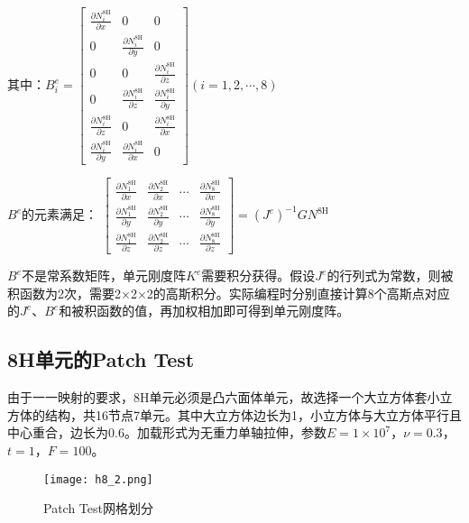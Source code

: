 \documentclass[forprint]{WHUBachelor}
\begin{document}
其中：$B_{i}^{e}=\left[\begin{array}{ccc}
\frac{\partial N_{i}^{8\mathrm{H}}}{\partial x} & 0 & 0\\
0 & \frac{\partial N_{i}^{8\mathrm{H}}}{\partial y} & 0\\
0 & 0 & \frac{\partial N_{i}^{8\mathrm{H}}}{\partial z}\\
0 & \frac{\partial N_{i}^{8\mathrm{H}}}{\partial z} & \frac{\partial N_{i}^{8\mathrm{H}}}{\partial y}\\
\frac{\partial N_{i}^{8\mathrm{H}}}{\partial z} & 0 & \frac{\partial N_{i}^{8\mathrm{H}}}{\partial x}\\
\frac{\partial N_{i}^{8\mathrm{H}}}{\partial y} & \frac{\partial N_{i}^{8\mathrm{H}}}{\partial x} & 0
\end{array}\right](i=1,2,\cdots,8)$
 
$B^{e}$的元素满足：
$\left[\begin{array}{cccc}
\frac{\partial N_{1}^{8\mathrm{H}}}{\partial x} & \frac{\partial N_{2}^{8\mathrm{H}}}{\partial x} & \cdots & \frac{\partial N_{8}^{8\mathrm{H}}}{\partial x}\\
\frac{\partial N_{1}^{8\mathrm{H}}}{\partial y} & \frac{\partial N_{2}^{8\mathrm{H}}}{\partial y} & \cdots & \frac{\partial N_{8}^{8\mathrm{H}}}{\partial y}\\
\frac{\partial N_{1}^{8\mathrm{H}}}{\partial z} & \frac{\partial N_{2}^{8\mathrm{H}}}{\partial z} & \cdots & \frac{\partial N_{8}^{8\mathrm{H}}}{\partial z}
\end{array}\right]=(J^{e})^{-1}GN^{8\mathrm{H}}$

 $B^{e}$不是常系数矩阵，单元刚度阵$K^{e}$需要积分获得。假设$J^{e}$的行列式为常数，则被积函数为2次，需要2×2×2的高斯积分。实际编程时分别直接计算8个高斯点对应的$J^{e}$、$B^{e}$和被积函数的值，再加权相加即可得到单元刚度阵。

\subsection{8H单元的Patch Test}
 由于一一映射的要求，8H单元必须是凸六面体单元，故选择一个大立方体套小立方体的结构，共16节点7单元。其中大立方体边长为1，小立方体与大立方体平行且中心重合，边长为0.6。加载形式为无重力单轴拉伸，参数$E=1×10^{7}$，$\nu=0.3$，$t=1$，$F=100$。            

\begin{figure}[H]
\centering  
\texttt{[image: h8\_2.png]} 
\caption{Patch Test网格划分} 
\label{f2.2} 
\end{figure}
\end{document}
